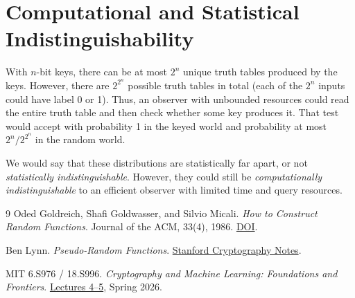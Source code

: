 \documentclass[11pt,fleqn]{article}
\begin{document}
\section{Computational and Statistical Indistinguishability}

With $n$-bit keys, there can be at most $2^n$ unique truth tables produced by the keys. However, there are $2^{2^n}$ possible truth tables in total (each of the $2^n$ inputs could have label 0 or 1). Thus, an observer with unbounded resources could read the entire truth table and then check whether some key produces it. That test would accept with probability 1 in the keyed world and probability at most $2^n / 2^{2^n}$ in the random world.

We would say that these distributions are statistically far apart, or not \textit{statistically indistinguishable}. However, they could still be \textit{computationally indistinguishable} to an efficient observer with limited time and query resources.

\begin{thebibliography}{9}
Oded Goldreich, Shafi Goldwasser, and Silvio Micali.
\emph{How to Construct Random Functions}.
Journal of the ACM, 33(4), 1986.
\href{https://doi.org/10.1145/6490.6503}{DOI}.

Ben Lynn. \emph{Pseudo-Random Functions}.
\href{https://crypto.stanford.edu/pbc/notes/crypto/prf.html}
{Stanford Cryptography Notes}.

MIT 6.S976 / 18.S996.
\emph{Cryptography and Machine Learning: Foundations and Frontiers}.
\href{https://mlcrypto.mit.edu/course/}{Lectures 4--5}, Spring 2026.
\end{thebibliography}
\end{document}
